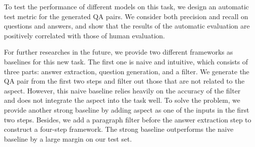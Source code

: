 To test the performance of different models on this task, we design an automatic test metric for the generated QA pairs. We consider both precision and recall on questions and answers, and show that the results of the automatic evaluation are positively correlated with those of human evaluation.



For further researches in the future, we provide two different frameworks as baselines for this new task. The first one is naive and intuitive, which consists of three parts: answer extraction, question generation, and a filter. We generate the QA pair from the first two steps and filter out those that are not related to the aspect. However, this naive baseline relies heavily on the accuracy of the filter and does not integrate the aspect into the task well. To solve the problem, we provide another strong baseline by adding aspect as one of the inputs in the first two steps. Besides, we add a paragraph filter before the answer extraction step to construct a four-step framework. The strong baseline outperforms the naive baseline by a large margin on our test set.


